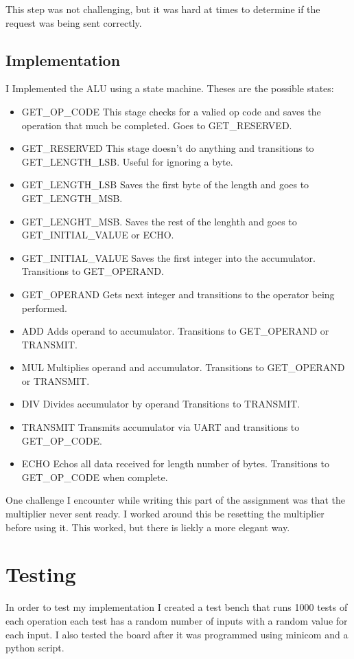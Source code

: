 \documentclass{article}
\begin{document}
This step was not challenging, but it was hard at times to determine if the request was being sent correctly.
\subsection{Implementation}

I Implemented the ALU using a state machine. Theses are the possible states:
\begin{itemize}
  \item GET\_OP\_CODE
This stage checks for a valied op code and saves the operation that much be completed. Goes to GET\_RESERVED.
  \item GET\_RESERVED
This stage doesn't do anything and transitions to GET\_LENGTH\_LSB. Useful for ignoring a byte.
  \item GET\_LENGTH\_LSB
Saves the first byte of the length and goes to GET\_LENGTH\_MSB.
  \item GET\_LENGHT\_MSB.
Saves the rest of the lenghth and goes to GET\_INITIAL\_VALUE or ECHO.
  \item GET\_INITIAL\_VALUE
Saves the first integer into the accumulator. Transitions to GET\_OPERAND.
  \item GET\_OPERAND
Gets next integer and transitions to the operator being performed.
  \item ADD
Adds operand to accumulator. Transitions to GET\_OPERAND or TRANSMIT.
  \item MUL
Multiplies operand and accumulator. Transitions to GET\_OPERAND or TRANSMIT.
  \item DIV
Divides accumulator by operand Transitions to TRANSMIT.
  \item TRANSMIT
Transmits accumulator via UART and transitions to GET\_OP\_CODE.
  \item ECHO
Echos all data received for length number of bytes. Transitions to GET\_OP\_CODE when complete.

\end{itemize}

One challenge I encounter while writing this part of the assignment was that the multiplier never sent ready. I worked around this be resetting the multiplier before using it. This worked, but there is liekly a more elegant way.
\section{Testing}
In order to test my implementation I created a test bench that runs 1000 tests of each operation each test has a random number of inputs with a random value for each input. I also tested the board after it was programmed using minicom and a python script.
\end{document}
